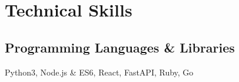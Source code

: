\documentclass[]{deedy-resume-openfont}
\begin{document}
\begin{minipage}[t]{0.33\textwidth}



    \section{Technical Skills}
    \subsection{Programming Languages \& Libraries}
    \vspace{\topsep} %
    Python3, Node.js \& ES6, React, FastAPI, Ruby, Go \\
    \vspace{\topsep} %
    \vspace{\topsep} %
    

\end{minipage}
\end{document}
